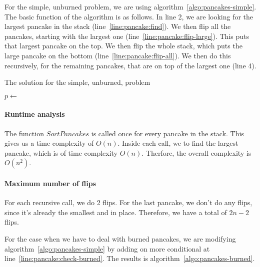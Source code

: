 

For the simple, unburned problem, we are using algorithm~\ref{algo:pancakes-simple}.
The basic function of the algorithm is as follows.
In line 2, we are looking for the largest pancake in the stack (line~\ref{line:pancake:find}).
We then flip all the pancakes, starting with the largest one (line~\ref{line:pancake:flip-large}).
This puts that largest pancake on the top.
We then flip the whole stack, which puts the large pancake on the bottom (line~\ref{line:pancake:flip-all}).
We then do this recursively, for the remaining pancakes, that are on top of the largest one (line 4).

\begin{algorithm}
	\caption{The solution for the simple, unburned, problem}
	\begin{algorithmic}[1]
			\State \Return
		\EndIf
	  	\State $p \gets$   \label{line:pancake:find}
		\State {}  \label{line:pancake:flip-large}
		\State {}  \label{line:pancake:flip-all}
		\State {}
	  \EndFunction
	\end{algorithmic}
	\label{algo:pancakes-simple}
\end{algorithm}

\paragraph{Runtime analysis}
The function $SortPancakes$ is called once for every pancake in the stack.
This gives us a time complexity of $O(n)$.
Inside each call, we to find the largest pancake, which is of time complexity $O(n)$.
Therfore, the overall complexity is $O(n^{2})$.

\paragraph{Maximum number of flips}
For each recursive call, we do 2 flips.
For the last pancake, we don't do any flips, since it's already the smallest and in place.
Therefore, we have a total of $2n-2$ flips.

For the case when we have to deal with burned pancakes, we are modifying algorithm~\ref{algo:pancakes-simple} by adding on more conditional at line~\ref{line:pancake:check-burned}.
The results is algorithm~\ref{algo:pancakes-burned}.

